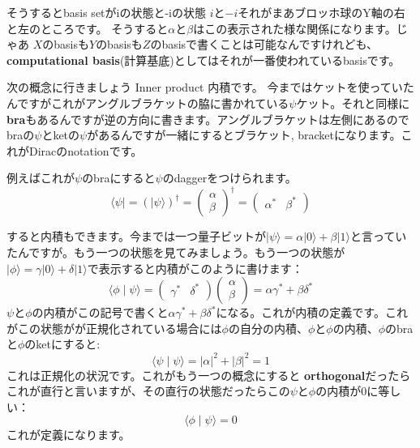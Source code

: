 そうするとbasis setがiの状態と-iの状態
$i$と$-i$それがまあブロッホ球のY軸の右と左のところです。
そうすると$\alpha$と$\beta$はこの表示された様な関係になります。じゃあ
$X$のbasisも$Y$のbasisも$Z$のbasisで書くことは可能なんですけれども、
\textbf{computational basis}(計算基底)としてはそれが一番使われているbasisです。

次の概念に行きましょう Inner product 内積です。
今まではケットを使っていたんですがこれがアングルブラケットの脇に書かれている$\psi$ケット。それと同様に\textbf{bra}もあるんですが逆の方向に書きます。アングルブラケットは左側にあるので braの$\psi$とketの$\psi$があるんですが一緒にするとブラケット, bracketになります。これがDiracのnotationです。

例えばこれが$\psi$のbraにすると$\psi$のdaggerをつけられます。
\begin{equation}
\langle\psi|=(|\psi\rangle)^{\dagger}=\left(\begin{array}{l}
\alpha \\
\beta
\end{array}\right)^{\dagger}=\left(\begin{array}{ll}
\alpha^{*} & \beta^{*}
\end{array}\right)
\end{equation}

すると内積もできます。今までは一つ量子ビットが$|\psi\rangle=\alpha|0\rangle+\beta|1\rangle$と言っていたんですが。もう一つの状態を見てみましょう。もう一つの状態が$|\phi\rangle=\gamma|0\rangle+\delta|1\rangle$で表示すると内積がこのように書けます：
\begin{equation}
\langle\phi \mid \psi\rangle=\left(\begin{array}{ll}
\gamma^{*} & \delta^{*}
\end{array}\right)\left(\begin{array}{c}
\alpha \\
\beta
\end{array}\right)=\alpha \gamma^{*}+\beta \delta^{*}
\end{equation}
$\psi$と$\phi$の内積がこの記号で書くと$\alpha\gamma^{*} + \beta\delta^{*}$になる。これが内積の定義です。これがこの状態がが正規化されている場合には$\phi$の自分の内積、$\phi$と$\phi$の内積、$\phi$のbraと$\phi$のketにすると:
\begin{equation}
\langle\psi \mid \psi\rangle=|\alpha|^{2}+|\beta|^{2}=1
\end{equation}
これは正規化の状況です。これがもう一つの概念にすると
\textbf{orthogonal}だったらこれが直行と言いますが、その直行の状態だったらこの$\psi$と$\phi$の内積が$0$に等しい：
\begin{equation}
\langle\phi \mid \psi\rangle=0
\end{equation}
これが定義になります。

